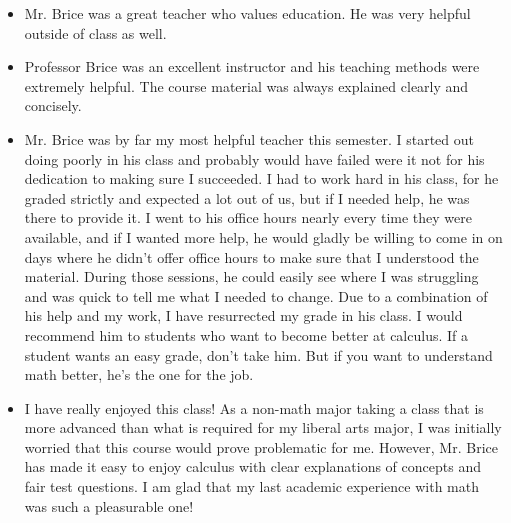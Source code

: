 \documentclass[11pt]{article}
\begin{document}
	\begin{itemize}
	
		\item{} Mr. Brice was a great teacher who values education. He was very helpful outside of class as well.
		
		\item{} Professor Brice was an excellent instructor and his teaching methods were extremely helpful. The course material was always explained clearly and concisely.
		
		\item{} Mr. Brice was by far my most helpful teacher this semester. I started out doing poorly in his class and probably would have failed were it not for his dedication to making sure I succeeded. I had to work hard in his class, for he graded strictly and expected a lot out of us, but if I needed help, he was there to provide it. I went to his office hours nearly every time they were available, and if I wanted more help, he would gladly be willing to come in on days where he didn't offer office hours to make sure that I understood the material. During those sessions, he could easily see where I was struggling and was quick to tell me what I needed to change. Due to a combination of his help and my work, I have resurrected my grade in his class. I would recommend him to students who want to become better at calculus. If a student wants an easy grade, don't take him. But if you want to understand math better, he's the one for the job.
	\end{itemize}
	


	\begin{itemize}
	
		\item{} I have really enjoyed this class! As a non-math major taking a class that is more advanced than what is required for my liberal arts major, I was initially worried that this course would prove problematic for me. However, Mr. Brice has made it easy to enjoy calculus with clear explanations of concepts and fair test questions. I am glad that my last academic experience with math was such a pleasurable one!
	\end{itemize}
	
\end{document}
